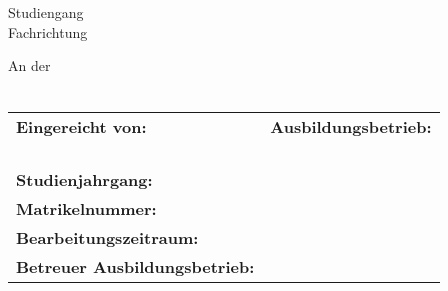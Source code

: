 \begin{titlepage}

	\thispagestyle{plain}

	\begin{figure}[H]
		\begin{flushright}
		\end{flushright}
	\end{figure}
	\vspace{-5pt}
	\begin{center}
		\vspace{2cm}
		\begin{LARGE}
			\art
			\\
			\vspace{16pt}
		\end{LARGE}
		\begin{Huge}
			\titel
			\\
			\vspace{14pt}
		\end{Huge}
		\begin{LARGE}
			\untertitel
		\end{LARGE}
	\end{center}

	\begin{center}
		Studiengang \studienfach\\
		Fachrichtung \fachrichtung

		An der \hochschule \\ \campus\\
	\end{center}

	\let\stretchbuffer\arraystretch %
	\renewcommand{\arraystretch}{1.25} %
	\begin{table}[b!]
		\normalsize
		\begin{tabularx}{\textwidth}{lX}
			\textbf{Eingereicht von:}             & \textbf{Ausbildungsbetrieb:} \\
			\autor                                & \firma                       \\
			\strassehausnr                        & \firmenstrasse               \\
			\plzwohnort                           & \firmenort                   \\
			\\[1cm]
			\textbf{Studienjahrgang:}             & \jahrgang                    \\
			\textbf{Matrikelnummer:}              & \matrikelnr                  \\
			\textbf{Bearbeitungszeitraum:}        & \bearbeitungszeitraum        \\[0.5cm]
			\textbf{Betreuer Ausbildungsbetrieb:} & \betreuer
		\end{tabularx}
	\end{table}
	\renewcommand{\arraystretch}{\stretchbuffer} %
	\clearpage
\end{titlepage}